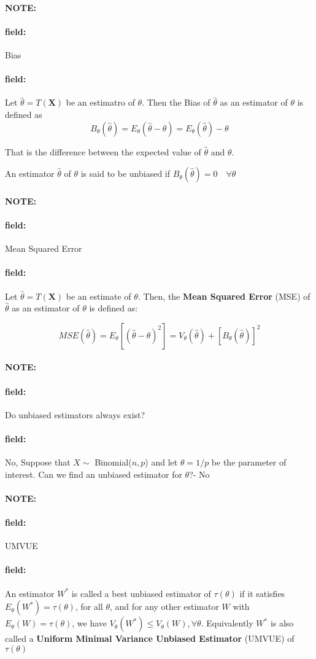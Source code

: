 \documentclass[12pt]{article}
\newenvironment{note}{\paragraph{NOTE:}}{}
\newenvironment{field}{\paragraph{field:}}{}
\begin{document}
\begin{note}
  \begin{field}
    Bias
  \end{field}
  \begin{field}
    Let $\hat{\theta} = T(\mathbf{X})$ be an estimatro of $\theta$. Then the Bias of $\hat{\theta}$ as an estimator of $\theta$ is defined as
    $$B_{\theta}(\hat{\theta}) = E_\theta(\hat{\theta} - \theta) = E_\theta(\hat{\theta}) - \theta$$

    That is the difference between the expected value of $\hat{\theta}$ and $\theta$.

    An estimator $\hat{\theta}$ of $\theta$ is said to be unbiased if $B_\theta(\hat{\theta}) = 0 \quad \forall \theta$
  \end{field}
\end{note}

\begin{note}
  \begin{field}
    Mean Squared Error
  \end{field}
  \begin{field}
    Let $\hat{\theta} = T(\mathbf{X})$ be an estimate of $\theta$. Then, the \textbf{Mean Squared Error} (MSE) of $\hat{\theta}$ as an estimator of $\theta$ is defined as:

    $$ MSE (\hat{\theta}) = E_{\theta}[(\hat{\theta} - \theta)^2] = V_\theta(\hat{\theta}) + [B_\theta(\hat{\theta})]^2$$

  \end{field}
\end{note}

\begin{note}
  \begin{field}
    Do unbiased estimators always exist?
  \end{field}
  \begin{field}
    No, Suppose that $X \sim $ Binomial($n,p$) and let $\theta = 1/p$ be the parameter of interest. Can we find an unbiased estimator for $\theta$?- No
  \end{field}
\end{note}

\begin{note}
  \begin{field}
    UMVUE
  \end{field}
  \begin{field}
    An estimator $W^*$ is called a best unbiased estimator of $\tau(\theta)$ if it satisfies $E_\theta(W^*) = \tau(\theta)$, for all $\theta$, and for any other estimator $W$ with $E_\theta(W) = \tau(\theta)$, we have $V_\theta(W^*)\leq V_\theta(W), \forall \theta$. Equivalently $W^*$ is also called a \textbf{Uniform Minimal Variance Unbiased Estimator} (UMVUE) of $\tau(\theta)$
  \end{field}
\end{note}
\end{document}
